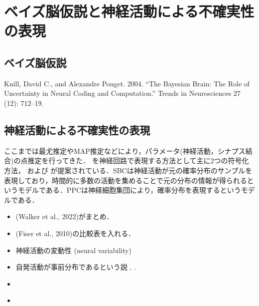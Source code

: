 \section{ベイズ脳仮説と神経活動による不確実性の表現}

\subsection{ベイズ脳仮説}
Knill, David C., and Alexandre Pouget. 2004. “The Bayesian Brain: The Role of Uncertainty in Neural Coding and Computation.” Trends in Neurosciences 27 (12): 712–19.

\subsection{神経活動による不確実性の表現}
ここまでは最尤推定やMAP推定などにより，パラメータ(神経活動，シナプス結合)の点推定を行ってきた．\textbf{} を神経回路で表現する方法として主に2つの符号化方法，\textbf{} および\textbf{} が提案されている．SBCは神経活動が元の確率分布のサンプルを表現しており，時間的に多数の活動を集めることで元の分布の情報が得られるというモデルである．PPCは神経細胞集団により，確率分布を表現するというモデルである．

\begin{itemize}
\item (Walker et al., 2022)がまとめ．
\item (Fiser et al., 2010)の比較表を入れる．
\item 神経活動の変動性 (neural variability)
\item 自発活動が事前分布であるという説 \cite{Fiser2010-kw}, \cite{Berkes2011-it}.
\item \cite{Hoyer2002-ci}
\item \cite{Sanborn2016-en}
\end{itemize}





